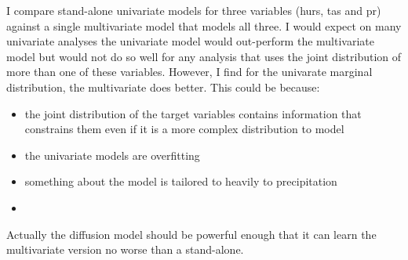 I compare stand-alone univariate models for three variables (hurs, tas and pr) against a single multivariate model that models all three. I would expect on many univariate analyses the univariate model would out-perform the multivariate model but would not do so well for any analysis that uses the joint distribution of more than one of these variables.
However, I find for the univarate marginal distribution, the multivariate does better.
This could be because:
\begin{itemize}
    \item the joint distribution of the target variables contains information that constrains them even if it is a more complex distribution to model
    \item the univariate models are overfitting
    \item something about the model is tailored to heavily to precipitation
    \item
\end{itemize}

Actually the diffusion model should be powerful enough that it can learn the multivariate version no worse than a stand-alone.
